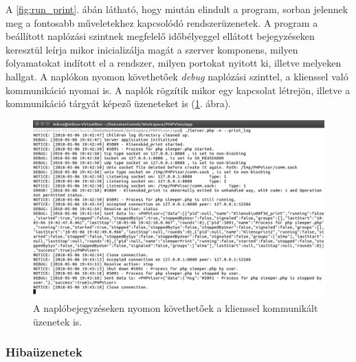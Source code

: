 \documentclass[12pt]{report}
\begin{document}
A \ref{fig:run_print}. ábán látható, hogy miután elindult a program, sorban jelennek meg a fontosabb műveletekhez kapcsolódó rendszerüzenetek. A program a beállított naplózási szintnek megfelelő időbélyeggel ellátott bejegyzéseken keresztül leírja mikor inicializálja magát a szerver komponens, milyen folyamatokat indított el a rendszer, milyen portokat nyitott ki, illetve melyeken hallgat. A naplókon nyomon követhetőek \textit{debug} naplózási szinttel, a klienssel való kommunikáció nyomai is. A naplók rögzítik mikor egy kapcsolat létrejön, illetve a kommunikáció tárgyát képező üzeneteket is (\ref{fig:runcon}. ábra).
  \begin{figure}[ht]
  \centering
  \includegraphics[width=14cm]{pics/runcon.png}
	  \caption{A naplóbejegyzéseken nyomon követhetőek a klienssel kommunikált üzenetek is. \newline}
      \label{fig:runcon}
  \end{figure}

  \subsubsection{Hibaüzenetek}
\end{document}
